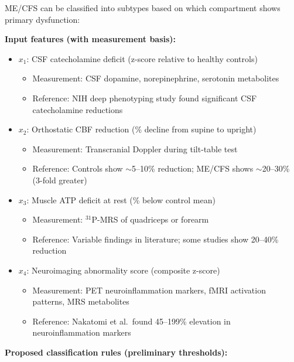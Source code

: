 \begin{speculation}
\label{spec:subtypes}
ME/CFS can be classified into subtypes based on which compartment shows primary dysfunction:

\textbf{Input features (with measurement basis):}
\begin{itemize}
    \item $x_1$: CSF catecholamine deficit (z-score relative to healthy controls)
    \begin{itemize}
        \item Measurement: CSF dopamine, norepinephrine, serotonin metabolites
        \item Reference: NIH deep phenotyping study found significant CSF catecholamine reductions~\cite{walitt2024deep}
    \end{itemize}
    \item $x_2$: Orthostatic CBF reduction (\% decline from supine to upright)
    \begin{itemize}
        \item Measurement: Transcranial Doppler during tilt-table test
        \item Reference: Controls show $\sim$5--10\% reduction; ME/CFS shows $\sim$20--30\% (3-fold greater)~\cite{VanCampenEtAl2020}
    \end{itemize}
    \item $x_3$: Muscle ATP deficit at rest (\% below control mean)
    \begin{itemize}
        \item Measurement: $^{31}$P-MRS of quadriceps or forearm
        \item Reference: Variable findings in literature; some studies show 20--40\% reduction~\cite{Wirth2021muscle,Jammes2021muscle}
    \end{itemize}
    \item $x_4$: Neuroimaging abnormality score (composite z-score)
    \begin{itemize}
        \item Measurement: PET neuroinflammation markers, fMRI activation patterns, MRS metabolites
        \item Reference: Nakatomi et al.\ found 45--199\% elevation in neuroinflammation markers~\cite{Nakatomi2014neuroinflammation}
    \end{itemize}
\end{itemize}

\textbf{Proposed classification rules (preliminary thresholds):}


\end{speculation}
